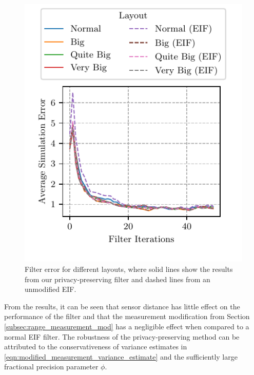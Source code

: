 \documentclass[10pt,letterpaper,oneside,twocolumn,journal]{IEEEtran}
\theoremstyle{definition}
\theoremstyle{definition}
\theoremstyle{remark}
\begin{document}
\begin{figure}[htbp]
\centering
\includegraphics{images/layout_errors.pdf}
\vspace{-\baselineskip}
\caption{Filter error for different layouts, where solid lines show the results from our privacy-preserving filter and dashed lines from an unmodified EIF.}
\label{fig:sim_layout_errors}
\end{figure}
From the results, it can be seen that sensor distance has little effect on the performance of the filter and that the measurement modification from Section \ref{subsec:range_measurement_mod} has a negligible effect when compared to a normal EIF filter. The robustness of the privacy-preserving method can be attributed to the conservativeness of variance estimates in \eqref{eqn:modified_measurement_variance_estimate} and the sufficiently large fractional precision parameter $\phi$.
\end{document}
